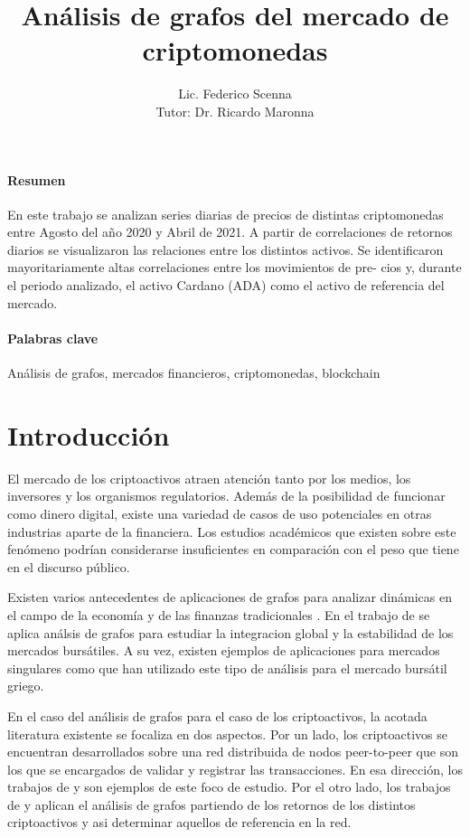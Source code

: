 \documentclass[runningheads,a4paper,10pt]{etc/llncs}
\title{Análisis de grafos del mercado de criptomonedas}
\author{Lic. Federico Scenna\\ [1cm] {\small Tutor: Dr. Ricardo Maronna}}
\institute{ Maestría en Exploración de Datos y Descubrimiento del Conocimiento \\
Facultad de Ciencias Exactas y Naturales\\ Universidad de Buenos Aires\\
\mailsa
}
\let\stdsection\section
\renewcommand\section{\newpage\stdsection}
\begin{document}
\let\oldaddcontentsline\addcontentsline
\def\addcontentsline#1#2#3{}
\maketitle
\def\addcontentsline#1#2#3{\oldaddcontentsline{#1}{#2}{#3}}

\newpage

\paragraph{Resumen} En este trabajo se analizan series diarias de precios de distintas criptomonedas entre Agosto del año 2020 y Abril de 2021. A partir de correlaciones
de retornos diarios se visualizaron las relaciones entre los distintos activos. Se
identificaron mayoritariamente altas correlaciones entre los movimientos de pre-
cios y, durante el periodo analizado, el activo Cardano (ADA) como el activo de
referencia del mercado.

\paragraph{Palabras clave} Análisis de grafos, mercados financieros, criptomonedas, blockchain

\tableofcontents

\newpage
\section{Introducción}

El mercado de los criptoactivos atraen atención tanto por los medios, los inversores y los organismos regulatorios. Además de la posibilidad de funcionar como dinero digital, existe una variedad de casos de uso potenciales en otras industrias aparte de la financiera. Los estudios académicos que existen sobre este fenómeno podrían considerarse insuficientes en comparación con el peso que tiene en el discurso público. 

Existen varios antecedentes de aplicaciones de grafos para analizar dinámicas en el campo de la economía y de las finanzas tradicionales \cite{economicsnetworks}. En el trabajo de \cite{towards} se aplica análsis de grafos para estudiar la integracion global y la estabilidad de los mercados bursátiles. A su vez, existen ejemplos de aplicaciones para mercados singulares como \cite{grekmarket}  que han utilizado este tipo de análisis para el mercado bursátil griego. 

En el caso del análisis de grafos para el caso de los criptoactivos, la acotada literatura existente se focaliza en dos aspectos. Por un lado, los criptoactivos se encuentran desarrollados sobre una red distribuida de nodos peer-to-peer que son los que se encargados de validar y registrar las transacciones. En esa dirección, los trabajos de \cite{btc-blockchain} y \cite{btc-btccash} son ejemplos de este foco de estudio. Por el otro lado, los trabajos de  \cite{cryptocurrency_rjc} y \cite{cryptonetwork} aplican el análisis de grafos partiendo de los retornos de los distintos criptoactivos y asi determinar aquellos de referencia en la red. 
\end{document}
